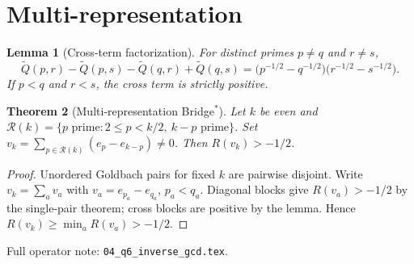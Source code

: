 \documentclass[11pt]{article}
\newtheorem{theorem}{Theorem}[section]
\newtheorem{lemma}[theorem]{Lemma}
\begin{document}
\section{Multi-representation}

\begin{lemma}[Cross-term factorization]
For distinct primes $p\neq q$ and $r\neq s$,
\[
\widetilde Q(p,r)-\widetilde Q(p,s)-\widetilde Q(q,r)+\widetilde Q(q,s)
=\bigl(p^{-1/2}-q^{-1/2}\bigr)\bigl(r^{-1/2}-s^{-1/2}\bigr).
\]
If $p<q$ and $r<s$, the cross term is strictly positive.
\end{lemma}

\begin{theorem}[Multi-representation Bridge$^*$]
Let $k$ be even and
$\mathcal{R}(k)=\{p\text{ prime}:2\le p<k/2,\ k-p\text{ prime}\}$.
Set $v_k=\sum_{p\in\mathcal{R}(k)}(e_p-e_{k-p})\neq 0$. Then $R(v_k)>-1/2$.
\end{theorem}

\begin{proof}
Unordered Goldbach pairs for fixed $k$ are pairwise disjoint.
Write $v_k=\sum_a v_a$ with $v_a=e_{p_a}-e_{q_a}$, $p_a<q_a$.
Diagonal blocks give $R(v_a)>-1/2$ by the single-pair theorem; cross blocks
are positive by the lemma. Hence $R(v_k)\ge\min_a R(v_a)>-1/2$.
\end{proof}

Full operator note: \texttt{04\_q6\_inverse\_gcd.tex}.
\end{document}

